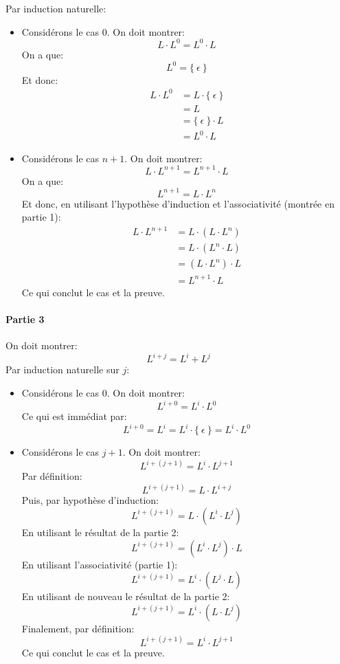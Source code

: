 \documentclass[12pt,french,a4paper]{article}
\begin{document}
\begin{question}
Par induction naturelle:
\begin{itemize}
\item
Considérons le cas $0$. On doit montrer:
\[
L \cdot L^0 = L^0 \cdot L
\]
On a que:
\[
L^0 = \{\ \epsilon\ \}
\]
Et donc:
\begin{align*}
L \cdot L^0 &= L \cdot \{\ \epsilon\ \} \\
&= L \\
&= \{\ \epsilon\ \} \cdot L\\
&= L^0 \cdot L
\end{align*}
\item
Considérons le cas $n + 1$. On doit montrer:
\[
L \cdot L^{n + 1} = L^{n + 1} \cdot L
\]
On a que:
\[
L^{n + 1} = L \cdot L^n
\]
Et donc, en utilisant l'hypothèse d'induction et l'associativité (montrée en partie 1):
\begin{align*}
L \cdot L^{n + 1} &= L \cdot (L \cdot L^n) \\
&= L \cdot (L^n \cdot L) \\
&= (L \cdot L^n) \cdot L\\
&= L^{n + 1} \cdot L
\end{align*}
Ce qui conclut le cas et la preuve.
\end{itemize}

\paragraph{Partie 3}
On doit montrer:
\[
L^{i + j} = L^i + L^j
\]
Par induction naturelle sur $j$:
\begin{itemize}
\item
Considérons le cas $0$. On doit montrer:
\[
L^{i + 0} = L^{i} \cdot L^0
\]
Ce qui est immédiat par:
\[
L^{i + 0} = L^i = L^i \cdot \{\ \epsilon\ \} = L^i \cdot L^0
\]
\item
Considérons le cas $j + 1$. On doit montrer:
\[
L^{i + (j + 1)} = L^{i} \cdot L^{j + 1}
\]
Par définition:
\[
L^{i + (j + 1)} = L \cdot L^{i + j}
\]
Puis, par hypothèse d'induction:
\[
L^{i + (j + 1)} = L \cdot (L^i \cdot L^j)
\]
En utilisant le résultat de la partie 2:
\[
L^{i + (j + 1)} = (L^i \cdot L^j) \cdot L
\]
En utilisant l'associativité (partie 1):
\[
L^{i + (j + 1)} = L^i \cdot (L^j \cdot L)
\]
En utilisant de nouveau le résultat de la partie 2:
\[
L^{i + (j + 1)} = L^i \cdot (L \cdot L^j)
\]
Finalement, par définition:
\[
L^{i + (j + 1)} = L^i \cdot L^{j + 1}
\]
Ce qui conclut le cas et la preuve.
\end{itemize}

\end{question}

\begin{question}
\end{question}
\end{document}
